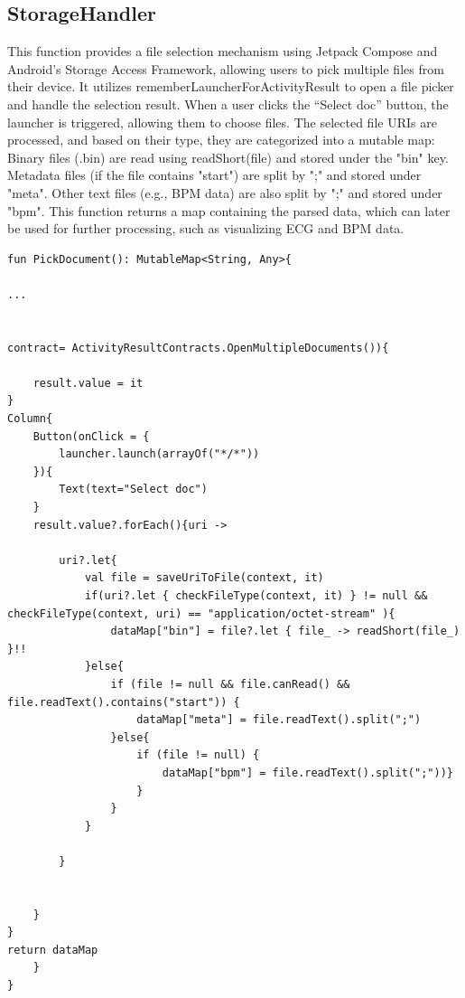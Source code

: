 {{	\subsection{StorageHandler}
	This function provides a file selection mechanism using Jetpack Compose and Android’s Storage Access Framework, allowing users to pick multiple files from their device. It utilizes rememberLauncherForActivityResult to open a file picker and handle the selection result.
	When a user clicks the “Select doc” button, the launcher is triggered, allowing them to choose files. The selected file URIs are processed, and based on their type, they are categorized into a mutable map:
	Binary files (.bin) are read using readShort(file\textunderscore) and stored under the "bin" key.
	Metadata files (if the file contains "start") are split by ";" and stored under "meta".
	Other text files (e.g., BPM data) are also split by ";" and stored under "bpm".
	This function returns a map containing the parsed data, which can later be used for further processing, such as visualizing ECG and BPM data.
	
	
		\begin{lstlisting}[label={fig:simpleSourceGen.cs}, caption={Code for filechooser functionality}]
fun PickDocument(): MutableMap<String, Any>{
		
...


contract= ActivityResultContracts.OpenMultipleDocuments()){
	
	result.value = it
}
Column{
	Button(onClick = {
		launcher.launch(arrayOf("*/*"))
	}){
		Text(text="Select doc")
	}
	result.value?.forEach(){uri ->
		
		uri?.let{
			val file = saveUriToFile(context, it)
			if(uri?.let { checkFileType(context, it) } != null && checkFileType(context, uri) == "application/octet-stream" ){
				dataMap["bin"] = file?.let { file_ -> readShort(file_) }!!
			}else{
				if (file != null && file.canRead() && file.readText().contains("start")) {
					dataMap["meta"] = file.readText().split(";")
				}else{
					if (file != null) {
						dataMap["bpm"] = file.readText().split(";"))}
					}
				}
			}
			
		}
		
		
	}
}
return dataMap
	}
}
		
	\end{lstlisting}
}}
